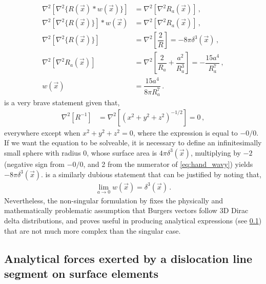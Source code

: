 \begin{subequations}
    \begin{align}
        \nabla^{2}[\nabla^{2} \{R(\vec{x}) * w(\vec{x})\} ] & = \nabla^{2}[\nabla^{2} R_{a}(\vec{x})]\,,                                                             \\
        \nabla^{2}[\nabla^{2} \{R(\vec{x})\}] * w(\vec{x})  & = \nabla^{2}[\nabla^{2} R_{a}(\vec{x})]\,,                                                             \\
        \nabla^{2}[\nabla^{2} \{R(\vec{x})\}]               & = \nabla^{2}\left[\dfrac{2}{R}\right] = -8\pi \delta^{3}(\vec{x}) \label{eq:hand_wavy}\,,              \\
        \nabla^{2}[\nabla^{2} R_{a}(\vec{x})]               & = \nabla^{2}\left[\dfrac{2}{R_{a}} + \dfrac{a^{2}}{R_{a}^{3}}\right] = -\dfrac{15 a^{4}}{R_{a}^{7}}\,, \\
        w(\vec{x})                                          & = \dfrac{15 a^{4}}{8\pi R_{a}^{7}} \label{eq:dist}\,.
    \end{align}
\end{subequations}
 is a very brave statement given that,
\begin{align}
    \nabla^{2} \left[R^{-1}\right] & = \nabla^{2}\left[(x^{2} + y^{2} + z^{2})^{-1/2}\right] = 0\,,
\end{align}
everywhere except when $x^2 + y^2 + z^2 = 0$, where the expression is equal to $-0/0$. If we want the equation to be solveable, it is necessary to define an infinitesimally small sphere with radius 0, whose surface area is $4\pi\delta^3(\vec{x})$, multiplying by $-2$ (negative sign from $-0/0$, and 2 from the numerator of \cref{eq:hand_wavy}) yields $-8\pi\delta^3(\vec{x})$.  is a similarly dubious statement that can be justified by noting that,
\begin{align}
    \lim\limits_{a\to 0} w(\vec{x}) = \delta^{3}(\vec{x})\,.
\end{align}
Nevertheless, the non-singular formulation by \citet{a_non-singular_continuum_theory_of_dislocations} fixes the physically and mathematically problematic assumption that Burgers vectors follow 3D Dirac delta distributions, and proves useful in producing analytical expressions (see \cref{ss:analytic_forces}) that are not much more complex than the singular case.

\subsection{Analytical forces exerted by a dislocation line segment on surface elements}
\label{ss:analytic_forces}

